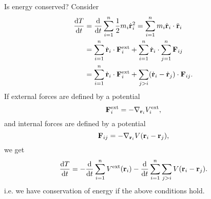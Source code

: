 Is energy conserved? Consider 
\begin{align*}
    \frac{\mathrm{d}T}{\mathrm{d}t} &= \frac{\mathrm{d}}{\mathrm{d}t}\sum_{i=1}^{n}\frac{1}{2}m_i \dot{{\bf r}}_i^2 = \sum_{i=1}^{n}m_i \dot{{\bf r}}_i \cdot \ddot{{\bf r}}_i\\
    &= \sum_{i=1}^{n} \dot{{\bf r}}_i \cdot {\bf F}_i^{\text{ext}}+\sum_{i=1}^{n}\dot{{\bf r}}_i \cdot \sum_{j=1}^{n}{\bf F}_{ij}\\ 
    &= \sum_{i=1}^{n} \dot{{\bf r}}_i \cdot {\bf F}_i^{\text{ext}}+ \sum_{j>i} (\dot{{\bf r}}_i-\dot{{\bf r}}_j)\cdot {\bf F}_{ij}.
\end{align*}
If external forces are defined by a potential 
\[
    {\bf F}_{i}^{\text{ext}} = - \nabla_{{\bf r}_i} V_i^{\text{ext}},
\]
and internal forces are defined by a potential 
\[
    {\bf F}_{ij} = -\nabla _{{\bf r}_i} V({\bf r}_i-{\bf r}_j),
\]
we get 
\[
    \frac{\mathrm{d}T}{\mathrm{d}t} = - \frac{\mathrm{d}}{\mathrm{d}t}\sum_{i=1}^{n}V^{\text{ext}}({\bf r}_i) - \frac{\mathrm{d}}{\mathrm{d}t}\sum_{i=1}^{n}\sum_{j>i} V({\bf r}_i-{\bf r}_j).
\]
i.e. we have conservation of energy if the above conditions hold.